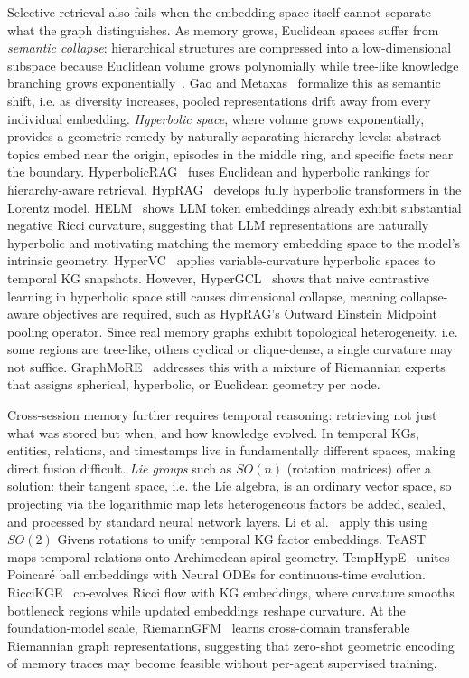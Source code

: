 \documentclass[hf]{ceurart}
\begin{document}
Selective retrieval also fails when the embedding space itself cannot
separate what the graph distinguishes. As memory grows, Euclidean
spaces suffer from \emph{semantic collapse}: hierarchical structures
are compressed into a low-dimensional subspace because Euclidean
volume grows polynomially while tree-like knowledge branching grows
exponentially~\cite{nickel2017poincare}. Gao and
Metaxas~\cite{gao2026semanticshift} formalize this as semantic
shift, i.e. as diversity increases, pooled representations drift away
from every individual embedding. \emph{Hyperbolic space}, where
volume grows exponentially, provides a geometric remedy by naturally
separating hierarchy levels: abstract topics embed near the origin,
episodes in the middle ring, and specific facts near the boundary.
HyperbolicRAG~\cite{hyperbolicrag2025} fuses Euclidean and hyperbolic
rankings for hierarchy-aware retrieval.
HypRAG~\cite{hyprag2026} develops fully hyperbolic transformers in
the Lorentz model. HELM~\cite{helm2025} shows LLM token embeddings
already exhibit substantial negative Ricci curvature, suggesting that
LLM representations are naturally hyperbolic and motivating matching
the memory embedding space to the model's intrinsic geometry.
HyperVC~\cite{hypervc2022} applies variable-curvature hyperbolic
spaces to temporal KG snapshots. However,
HyperGCL~\cite{hypergcl2025} shows that naive contrastive learning in
hyperbolic space still causes dimensional collapse, meaning
collapse-aware objectives are required, such as HypRAG's Outward
Einstein Midpoint pooling operator. Since real memory graphs exhibit
topological heterogeneity, i.e. some regions are tree-like, others
cyclical or clique-dense, a single curvature may not suffice.
GraphMoRE~\cite{graphmore2025} addresses this with a mixture of
Riemannian experts that assigns spherical, hyperbolic, or Euclidean
geometry per node.

Cross-session memory further requires temporal reasoning: retrieving
not just what was stored but when, and how knowledge evolved. In
temporal KGs, entities, relations, and timestamps live in
fundamentally different spaces, making direct fusion difficult.
\emph{Lie groups} such as $SO(n)$ (rotation matrices) offer a
solution: their tangent space, i.e. the Lie algebra, is an ordinary
vector space, so projecting via the logarithmic map lets
heterogeneous factors be added, scaled, and processed by standard
neural network layers. Li et al.~\cite{tkgembed2025} apply this
using $SO(2)$ Givens rotations to unify temporal KG factor
embeddings. TeAST~\cite{teast2023} maps temporal relations onto
Archimedean spiral geometry.
TempHypE~\cite{temphype2025} unites Poincar\'{e} ball embeddings
with Neural ODEs for continuous-time evolution.
RicciKGE~\cite{riccikge2025} co-evolves Ricci flow with KG
embeddings, where curvature smooths bottleneck regions while updated
embeddings reshape curvature. At the foundation-model scale,
RiemannGFM~\cite{riemanngfm2025} learns cross-domain transferable
Riemannian graph representations, suggesting that zero-shot geometric
encoding of memory traces may become feasible without per-agent
supervised training.
\end{document}

